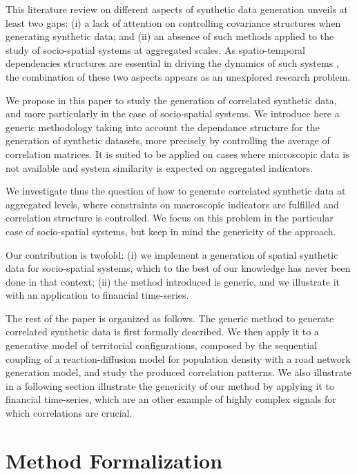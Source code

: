 \documentclass{bmcart}
\begin{document}
This literature review on different aspects of synthetic data generation unveils at least two gaps: (i) a lack of attention on controlling covariance structures when generating synthetic data; and (ii) an absence of such methods applied to the study of socio-spatial systems at aggregated scales. As spatio-temporal dependencies structures are essential in driving the dynamics of such systems \cite{pigozzi1980interurban,chen2009urban}, the combination of these two aspects appears as an unexplored research problem.

We propose in this paper to study the generation of correlated synthetic data, and more particularly in the case of socio-spatial systems. We introduce here a generic methodology taking into account the dependance structure for the generation of synthetic datasets, more precisely by controlling the average of correlation matrices. It is suited to be applied on cases where microscopic data is not available and system similarity is expected on aggregated indicators.

We investigate thus the question of how to generate correlated synthetic data at aggregated levels, where constraints on macroscopic indicators are fulfilled and correlation structure is controlled. We focus on this problem in the particular case of socio-spatial systems, but keep in mind the genericity of the approach.

Our contribution is twofold: (i) we implement a generation of spatial synthetic data for socio-spatial systems, which to the best of our knowledge has never been done in that context; (ii) the method introduced is generic, and we illustrate it with an application to financial time-series.

The rest of the paper is organized as follows. The generic method to generate correlated synthetic data is first formally described. We then apply it to a generative model of territorial configurations, composed by the sequential coupling of a reaction-diffusion model for population density with a road network generation model, and study the produced correlation patterns. We also illustrate in a following section illustrate the genericity of our method by applying it to financial time-series, which are an other example of highly complex signals for which correlations are crucial.


\section*{Method Formalization}
\end{document}
